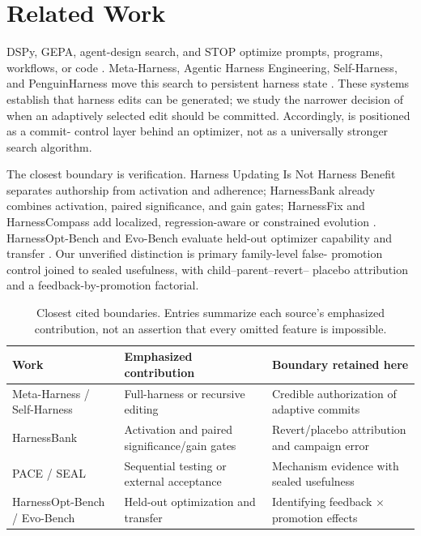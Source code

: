 \section{Related Work}
\label{sec:related}

DSPy, GEPA, agent-design search, and STOP optimize prompts, programs, workflows,
or code \citep{khattab2023dspy,agrawal2025gepa,hu2025adas,zelikman2024stop}.
Meta-Harness, Agentic Harness Engineering, Self-Harness, and PenguinHarness move
this search to persistent harness state
\citep{lee2026metaharness,lin2026ahe,zhang2026selfharness,
prismshadow2026penguin}.  These systems establish that harness edits can be
generated; we study the narrower decision of when an adaptively selected edit
should be committed.  Accordingly, \systemname{} is positioned as a commit-
control layer behind an optimizer, not as a universally stronger search
algorithm.

The closest boundary is verification.  Harness Updating Is Not Harness Benefit
separates authorship from activation and adherence; HarnessBank already combines
activation, paired significance, and gain gates; HarnessFix and HarnessCompass
add localized, regression-aware or constrained evolution
\citep{lin2026updating,luo2026harnessbank,chen2026harnessfix,
zhang2026harnesscompass}.  HarnessOpt-Bench and Evo-Bench evaluate held-out
optimizer capability and transfer \citep{ursekar2026harnessopt,
huang2026evobench}.  Our unverified distinction is primary family-level false-
promotion control joined to sealed usefulness, with child--parent--revert--
placebo attribution and a feedback-by-promotion factorial.

\begin{table}[ht]
  \caption{Closest cited boundaries.  Entries summarize each source's emphasized
  contribution, not an assertion that every omitted feature is impossible.}
  \label{tab:related-boundary}
  \centering
  \begin{tabular}{@{}p{1.32in}p{1.62in}p{2.00in}@{}}
    \toprule
    \raggedright\textbf{Work} & \raggedright\textbf{Emphasized contribution}
      & \raggedright\textbf{Boundary retained here} \tabularnewline
    \midrule
    \raggedright\mbox{Meta-Harness} / Self-Harness
      & \raggedright Full-harness or recursive editing
      & \raggedright Credible authorization of adaptive commits \tabularnewline
    \addlinespace[1pt]
    \raggedright HarnessBank
      & \raggedright Activation and paired significance/gain gates
      & \raggedright Revert/placebo attribution and campaign error \tabularnewline
    \addlinespace[1pt]
    \raggedright PACE / SEAL
      & \raggedright Sequential testing or external acceptance
      & \raggedright Mechanism evidence with sealed usefulness \tabularnewline
    \addlinespace[1pt]
    \raggedright\mbox{HarnessOpt-Bench} / Evo-Bench
      & \raggedright Held-out optimization and transfer
      & \raggedright Identifying feedback $\times$ promotion effects \tabularnewline
    \bottomrule
  \end{tabular}
\end{table}


